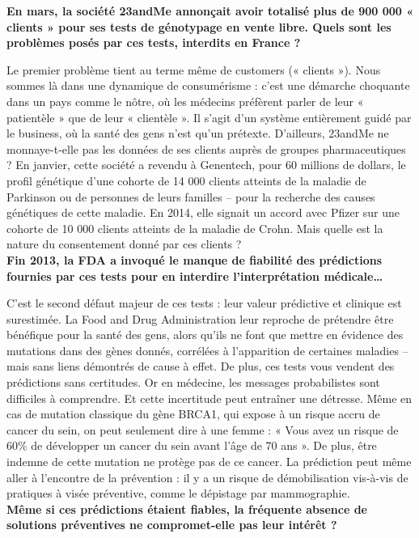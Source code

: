 \documentclass[8pt]{article}
\begin{document}
\textbf{En mars, la société 23andMe annonçait avoir totalisé plus de 900 000 « clients » pour ses tests de génotypage en vente libre. Quels sont les problèmes posés par ces tests, interdits en France ?}

Le premier problème tient au terme même de customers (« clients »). Nous sommes là dans une dynamique de consumérisme : c’est une démarche choquante dans un pays comme le nôtre, où les médecins préfèrent parler de leur « patientèle » que de leur « clientèle ». Il s’agit d’un système entièrement guidé par le business, où la santé des gens n’est qu’un prétexte. D’ailleurs, 23andMe ne monnaye-t-elle pas les données de ses clients auprès de groupes pharmaceutiques ? En janvier, cette société a revendu à Genentech, pour 60 millions de dollars, le profil génétique d’une cohorte de 14 000 clients atteints de la maladie de Parkinson ou de personnes de leurs familles – pour la recherche des causes génétiques de cette maladie. En 2014, elle signait un accord avec Pfizer sur une cohorte de 10 000 clients atteints de la maladie de Crohn. Mais quelle est la nature du consentement donné par ces clients ? \\

\textbf{Fin 2013, la FDA a invoqué le manque de fiabilité des prédictions fournies par ces tests pour en interdire l’interprétation médicale…}

C’est le second défaut majeur de ces tests : leur valeur prédictive et clinique est surestimée. La Food and Drug Administration leur reproche de prétendre être bénéfique pour la santé des gens, alors qu’ils ne font que mettre en évidence des mutations dans des gènes donnés, corrélées à l’apparition de certaines maladies – mais sans liens démontrés de cause à effet. De plus, ces tests vous vendent des prédictions sans certitudes. Or en médecine, les messages probabilistes sont difficiles à comprendre. Et cette incertitude peut entraîner une détresse. Même en cas de mutation classique du gène BRCA1, qui expose à un risque accru de cancer du sein, on peut seulement dire à une femme : « Vous avez un risque de 60\% de développer un cancer du sein avant l’âge de 70 ans ». De plus, être indemne de cette mutation ne protège pas de ce cancer. La prédiction peut même aller à l’encontre de la prévention : il y a un risque de démobilisation vis-à-vis de pratiques à visée préventive, comme le dépistage par mammographie. \\

\textbf{Même si ces prédictions étaient fiables, la fréquente absence de solutions préventives ne compromet-elle pas leur intérêt ?}
\end{document}
